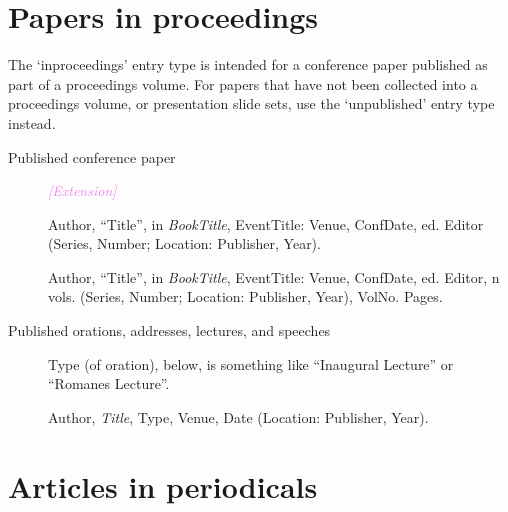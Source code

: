 \documentclass[extrafontsizes,11pt,a4paper,oneside]{memoir}
\newcommand*{\lit}[1]{\textsf{#1}}
\newcommand*{\code}[1]{`\textsf{#1}'}
\newcommand*{\aside}[1]{\textcolor{violet}{\emph{[#1]}}}
\begin{document}
\section{Papers in proceedings}\label{sec:inproceedings}

The \code{inproceedings} entry type is intended for a conference paper published as part of a proceedings volume. For papers that have not been collected into a proceedings volume, or presentation slide sets, use the \code{unpublished} entry type instead.

\begin{description}
  \item[Published conference paper] \aside{Extension}\par
  Author, \enquote{Title}, \lit{in} \emph{BookTitle}, EventTitle: Venue, ConfDate, \lit{ed.} Editor (Series, Number; Location: Publisher, Year).
  \\\par
  Author, \enquote{Title}, \lit{in} \emph{BookTitle}, EventTitle: Venue, ConfDate, \lit{ed.} Editor, n \lit{vols.} (Series, Number; Location: Publisher, Year), VolNo. Pages.
  \\
  
  \item[Published orations, addresses, lectures, and speeches] Type (of oration), below, is something like \enquote{Inaugural Lecture} or \enquote{Romanes Lecture}.\par Author, \emph{Title}, Type, Venue, Date (Location: Publisher, Year).
  \\
\end{description}

\section{Articles in periodicals}\label{sec:article}
\end{document}
